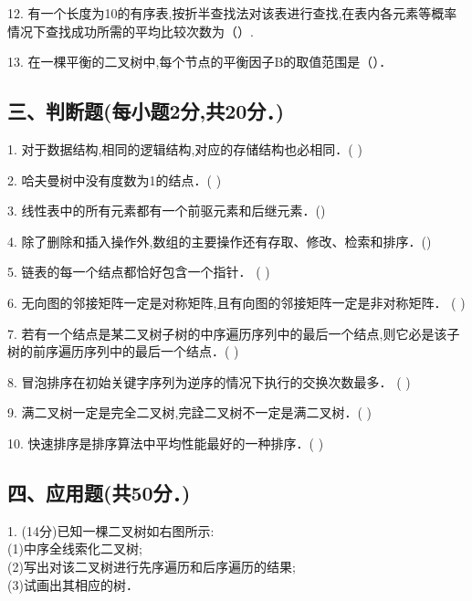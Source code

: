 12. 有一个长度为10的有序表,按折半查找法对该表进行查找,在表内各元素等概率情况下查找成功所需的平均比较次数为（）.

13. 在一棵平衡的二叉树中,每个节点的平衡因子B的取值范围是（）．

\subsection{三、判断题(每小题2分,共20分．)}

1. 对于数据结构,相同的逻辑结构,对应的存储结构也必相同．( )

2. 哈夫曼树中没有度数为1的结点．( )

3. 线性表中的所有元素都有一个前驱元素和后继元素．()

4. 除了删除和插入操作外,数组的主要操作还有存取、修改、检索和排序．()

5. 链表的每一个结点都恰好包含一个指针． ( )

6. 无向图的邻接矩阵一定是对称矩阵,且有向图的邻接矩阵一定是非对称矩阵． ( )

7. 若有一个结点是某二叉树子树的中序遍历序列中的最后一个结点,则它必是该子树的前序遍历序列中的最后一个结点．( )

8. 冒泡排序在初始关键字序列为逆序的情况下执行的交换次数最多． ( )

9. 满二叉树一定是完全二叉树,完詮二叉树不一定是满二叉树．( )

10. 快速排序是排序算法中平均性能最好的一种排序．( )

\subsection{四、应用题(共50分．)}

1. (14分)已知一棵二叉树如右图所示: \\
(1)中序全线索化二叉树; \\
(2)写出对该二叉树进行先序遍历和后序遍历的结果; \\
(3)试画出其相应的树．

